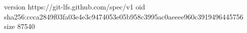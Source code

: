 version https://git-lfs.github.com/spec/v1
oid sha256:ccca2849f03fa03e4e3c9474053e05b958c3995ac0aeeee960c3919496445756
size 87540
